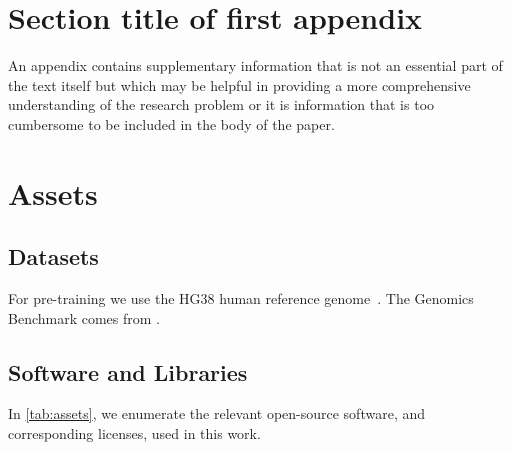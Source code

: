 \documentclass[pdflatex, sn-mathphys-num, lineno]{sn-jnl}%
\theoremstyle{thmstyleone}%
\theoremstyle{thmstyletwo}%
\theoremstyle{thmstylethree}%
\begin{document}
\begin{appendices}
	\printglossary[type=\acronymtype, title=Abbreviations]

	\section{Section title of first appendix}\label{secA1}

	An appendix contains supplementary information that is not an essential part of the text itself but which may be helpful in providing a more comprehensive understanding of the research problem or it is information that is too cumbersome to be included in the body of the paper.




	\section{Assets}\label{appsec:assets}
	\subsection{Datasets}
	For pre-training we use the HG38 human reference genome~\cite{genome2009genome}.
	The Genomics Benchmark comes from \citet{grevsova2023genomic}.

	\subsection{Software and Libraries}
	In \ref{tab:assets}, we enumerate the relevant open-source software, and corresponding licenses, used in this work.


\end{appendices}
\end{document}
